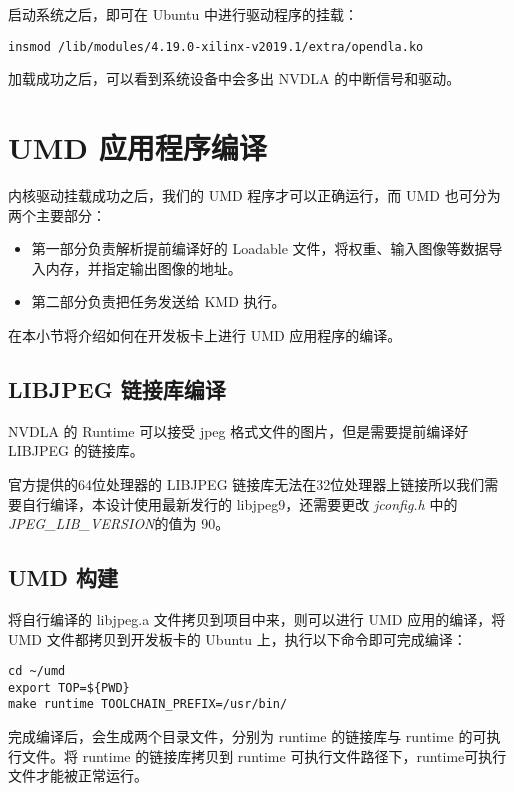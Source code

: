 启动系统之后，即可在 Ubuntu 中进行驱动程序的挂载：

\begin{lstlisting}
insmod /lib/modules/4.19.0-xilinx-v2019.1/extra/opendla.ko 
\end{lstlisting}

加载成功之后，可以看到系统设备中会多出 NVDLA 的中断信号和驱动。

\section{UMD 应用程序编译}

内核驱动挂载成功之后，我们的 UMD 程序才可以正确运行，而 UMD 也可分为两个主要部分：

\begin{itemize}
    \item 第一部分负责解析提前编译好的 Loadable 文件，将权重、输入图像等数据导入内存，并指定输出图像的地址。
    \item 第二部分负责把任务发送给 KMD 执行。
\end{itemize}

在本小节将介绍如何在开发板卡上进行 UMD 应用程序的编译。

\subsection{LIBJPEG 链接库编译}

NVDLA 的 Runtime 可以接受 jpeg 格式文件的图片，但是需要提前编译好 LIBJPEG 的链接库。

官方提供的64位处理器的 LIBJPEG 链接库无法在32位处理器上链接所以我们需要自行编译，本设计使用最新发行的 libjpeg9，还需要更改 \emph{jconfig.h} 中的 \emph{JPEG\_LIB\_VERSION}的值为 90。

\subsection{UMD 构建}

将自行编译的 libjpeg.a 文件拷贝到项目中来，则可以进行 UMD 应用的编译，将 UMD 文件都拷贝到开发板卡的 Ubuntu 上，执行以下命令即可完成编译：

\begin{lstlisting}
cd ~/umd
export TOP=${PWD}
make runtime TOOLCHAIN_PREFIX=/usr/bin/
\end{lstlisting}

完成编译后，会生成两个目录文件，分别为 runtime 的链接库与 runtime 的可执行文件。将 runtime 的链接库拷贝到 runtime 可执行文件路径下，runtime可执行文件才能被正常运行。

